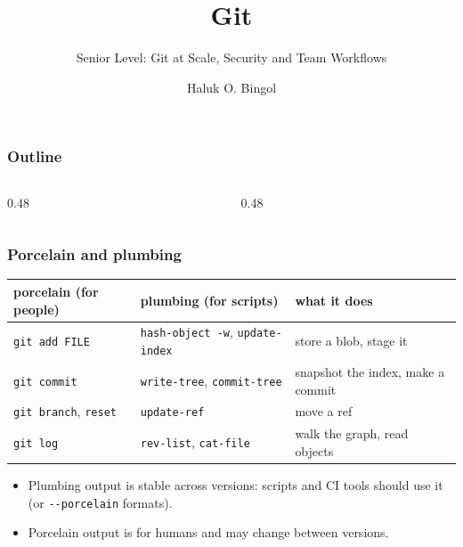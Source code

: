 \documentclass[aspectratio=169,10pt,compress]{beamer}
\title{Git}
\subtitle{Senior Level: Git at Scale, Security and Team Workflows}
\author[Bingol]{Haluk O. Bingol}
\institute[FCIS]{
    Faculty of Computer and Information Sciences\\
    Yeditepe University
}
\date{
	{\tiny \hbTimeStamp}
}
\begin{document}
\begin{frame}[t,fragile]
  \titlepage
\end{frame}




\begin{frame}[t,fragile] \frametitle{Outline}
  \begin{columns}[T]
    \begin{column}{0.48\textwidth}
      \tableofcontents[sections={1-4}, hideallsubsections]
    \end{column}
    \begin{column}{0.48\textwidth}
      \tableofcontents[sections={5-7}, hideallsubsections]
    \end{column}
  \end{columns}
\end{frame}





\begin{frame}[t,fragile] \frametitle{Porcelain and plumbing}
  \begin{center}\small
  \begin{tabular}{lll}
    \toprule
    \textbf{porcelain} (for people) & \textbf{plumbing} (for scripts)         & \textbf{what it does} \\
    \midrule
    \texttt{git add FILE}            & \texttt{hash-object -w}, \texttt{update-index} & store a blob, stage it \\
    \texttt{git commit}              & \texttt{write-tree}, \texttt{commit-tree}       & snapshot the index, make a commit \\
    \texttt{git branch}, \texttt{reset} & \texttt{update-ref}                          & move a ref \\
    \texttt{git log}                 & \texttt{rev-list}, \texttt{cat-file}            & walk the graph, read objects \\
    \bottomrule
  \end{tabular}
  \end{center}
  \begin{itemize}\small
    \item Plumbing output is stable across versions: scripts and CI tools should use it (or \texttt{-{}-porcelain} formats).
    \item Porcelain output is for humans and may change between versions.
  \end{itemize}
\end{frame}
\end{document}
